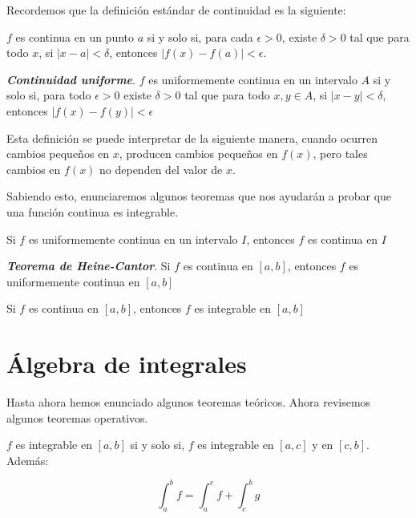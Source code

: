 \documentclass{report}
\begin{document}
    \begin{noteBox}
        Recordemos que la definición estándar de continuidad es la siguiente:

        $f$ es continua en un punto $a$ si y solo si, para cada $\epsilon > 0$, existe $\delta > 0$ tal que para todo $x$, si $|x-a|<\delta$, entonces $|f(x) -f(a)| < \epsilon$.
    \end{noteBox}
    \begin{defBox}
        \textit{\textbf{Continuidad uniforme}}. $f$ es uniformemente continua en un intervalo $A$ si y solo si, para todo $\epsilon > 0$ existe $\delta > 0$ tal que para todo $x, y \in A$, si $|x-y| < \delta$, entonces $|f(x) - f(y)| < \epsilon$
    \end{defBox}

    Esta definición se puede interpretar de la siguiente manera, cuando ocurren cambios pequeños en $x$, producen cambios pequeños en $f(x)$, pero tales cambios en $f(x)$ no dependen del valor de $x$.


    Sabiendo esto, enunciaremos algunos teoremas que nos ayudarán a probar que una función continua es integrable.

    \begin{thBox}
        Si $f$ es uniformemente continua en un intervalo $I$, entonces $f$ es continua en $I$
    \end{thBox}

    \begin{thBox}
        \textit{\textbf{Teorema de Heine-Cantor}}. Si $f$ es continua en $[a,b]$, entonces $f$ es uniformemente continua en $[a,b]$
    \end{thBox}

    \begin{thBox}
        Si $f$ es continua en $[a,b]$, entonces $f$ es integrable en $[a,b]$
    \end{thBox}


    \section{Álgebra de integrales}

    Hasta ahora hemos enunciado algunos teoremas teóricos. Ahora revisemos algunos teoremas operativos.

    \begin{thBox}
        $f$ es integrable en $[a,b]$ si y solo si, $f$ es integrable en $[a,c]$ y en $[c,b]$. Además:

        $$\int_{a}^{b}f = \int_{a}^{c}f + \int_{c}^{b}g$$
    \end{thBox}
\end{document}
